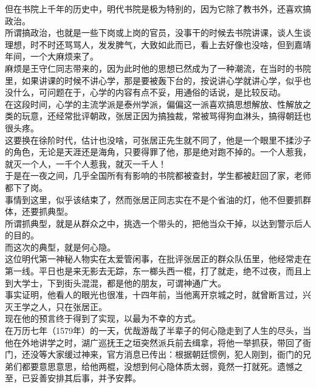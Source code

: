 \begin{multicols}{\theparacolNo}
但在书院上千年的历史中，明代书院是极为特别的，因为它除了教书外，还喜欢搞政治。\\

所谓搞政治，也就是一些下岗或上岗的官员，没事干的时候去书院讲课，谈人生谈理想，时不时还骂骂人，发发脾气，大致如此而已，看上去好像也没啥，但到嘉靖年间，一个大麻烦来了。\\

麻烦是王守仁同志带来的，因为此时他的思想已然成为了一种潮流，在当时的书院里，如果讲课的时候不讲心学，那是要被轰下台的，按说讲心学就讲心学，似乎也没什么，可问题在于，心学的内容有点不妥，用通俗的话说，是比较反动。\\

在这段时间，心学的主流学派是泰州学派，偏偏这一派喜欢搞思想解放、性解放之类的玩意，还经常批评朝政，张居正因为搞独裁，常被骂得狗血淋头，搞得朝廷也很头疼。\\

这要换在徐阶时代，估计也没啥，可张居正先生就不同了，他是一个眼里不揉沙子的角色，无论是天涯还是海角，只要得罪了他，那是绝对跑不掉的。一个人惹我，就灭一个人，一千个人惹我，就灭一千人！\\

于是在一夜之间，几乎全国所有有影响的书院都被查封，学生都被赶回了家，老师都下了岗。\\

事情到这里，似乎该结束了，然而张居正同志实在不是个省油的灯，他不但要抓群体，还要抓典型。\\

所谓抓典型，就是从群众之中，挑选一个带头的，把他当众干掉，以达到警示后人的目的。\\

而这次的典型，就是何心隐。\\

这位明代第一神秘人物实在太爱管闲事，在批评张居正的群众队伍里，他经常走在第一线。平日也是来无影去无踪，东一榔头西一棍，打了就走，绝不过夜，而且上到大学士，下到街头混混，都是他的朋友，可谓神通广大。\\

事实证明，他看人的眼光也很准，十四年前，当他离开京城之时，就曾断言过，兴灭王学之人，只在张居正。\\

现在他的预言终于得到了实现，以最为不幸的方式。\\

在万历七年（1579年）的一天，优哉游哉了半辈子的何心隐走到了人生的尽头，当他在外地讲学之时，湖广巡抚王之垣突然派兵前去缉拿，将他一举抓获，带回了衙门，还没等大家缓过神来，官方消息已传出：根据朝廷惯例，犯人刚到，衙门的兄弟们都要意思意思，给他两棍，没想到何心隐体质太弱，竟然一打就死。遗憾之至，已妥善安排其后事，并予安葬。\\


\end{multicols}

